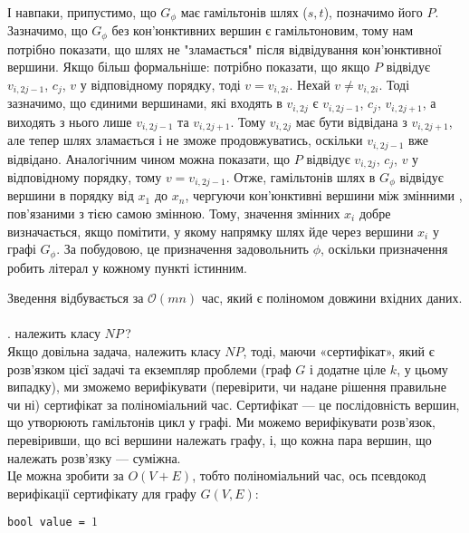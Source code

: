 \documentclass[14pt]{article}
\begin{document}
\begin{spacing}{1.175}
    \\
    \quad І навпаки, припустимо, що \(G_{\phi}\) має гамільтонів шлях (\(s, t\)), позначимо його \(P\). Зазначимо, що \(G_{\phi}\) без кон'юнктивних вершин є гамільтоновим, тому нам потрібно показати, що шлях не "зламається" \hspace{0.08cm}після відвідування кон'юнктивної вершини. Якщо більш формальніше: потрібно показати, що якщо \(P\) відвідує \(v_{i, 2j-1}\), \(c_j\), \(v\) у відповідному порядку, тоді \(v = v_{i,2i}\). Нехай \(v \neq v_{i,2i}\). Тоді зазначимо, що єдиними вершинами, які входять в \(v_{i,2j}\) є \(v_{i,2j-1}\), \(c_j\), \(v_{i,2j+1}\), а виходять з нього лише \(v_{i,2j-1}\) та \(v_{i,2j+1}\). Тому \(v_{i,2j}\) має бути відвідана з \(v_{i,2j+1}\), але тепер шлях зламається і не зможе продовжуватись, оскільки \(v_{i,2j-1}\) вже відвідано. Аналогічним чином можна показати, що \(P\) відвідує \(v_{i, 2j}\), \(c_j\), \(v\) у відповідному порядку, тому \(v = v_{i,2j-1}\). Отже, гамільтонів шлях в \(G_{\phi}\) відвідує вершини в порядку від \(x_1\) до \(x_n\), чергуючи кон'юнктивні вершини між змінними , пов'язаними з тією самою змінною. Тому, значення змінних \(x_i\) добре визначається, якщо помітити, у якому напрямку шлях йде через вершини \(x_i\) у графі \(G_{\phi}\). За побудовою, це призначення задовольнить \(\phi\), оскільки призначення робить літерал у кожному пункті істинним.
    
    \quad Зведення відбувається за \(\mathcal{O}(mn)\) час, який є поліномом довжини вхідних даних.
    \\


    \\
    . \hamcycle\hspace{0.05cm} належить класу \(NP\,\)?\\
        Якщо довільна задача, належить класу \(NP\), тоді, маючи «сертифікат», який є розв'язком цієї задачі та екземпляр проблеми (граф \(G\) і додатне ціле \(k\), у цьому випадку), ми зможемо верифікувати (перевірити, чи надане рішення правильне чи ні) сертифікат за поліноміальний час. Сертифікат — це послідовність вершин, що утворюють гамільтонів цикл у графі. Ми можемо верифікувати розв'язок, перевіривши, що всі вершини належать графу,\hspace{0,05cm} і, що кожна пара вершин, що належать розв’язку — суміжна.\\ Це можна зробити за \(O(V + E)\), тобто поліноміальний час, ось псевдокод верифікації сертифікату для графу \(G(V, E)\):
    
        \quad \texttt{bool value = \(1\)}
        

\end{spacing}
\end{document}
